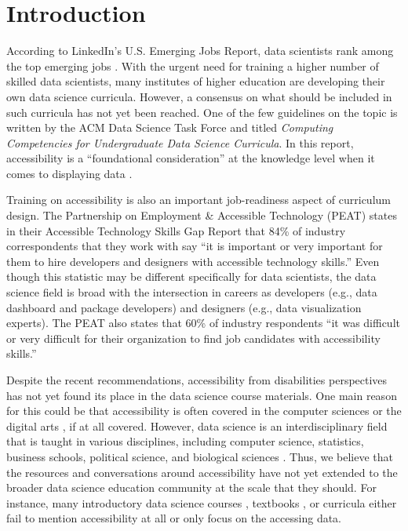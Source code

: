 \documentclass[12pt]{article}
\begin{document}
\newpage
{} %

\hypertarget{introduction}{%
\section{Introduction}\label{introduction}}

According to LinkedIn's U.S. Emerging Jobs Report, data scientists rank among the top emerging jobs \citeyearpar{linkedin}.
With the urgent need for training a higher number of skilled data scientists, many institutes of higher education are developing their own data science curricula.
However, a consensus on what should be included in such curricula has not yet been reached.
One of the few guidelines on the topic is written by the ACM Data Science Task Force and titled \emph{Computing Competencies for Undergraduate Data Science Curricula}. In this report, accessibility is a ``foundational consideration'' at the knowledge level when it comes to displaying data \citep{danyluk2021computing}.

Training on accessibility is also an important job-readiness aspect of curriculum design. The Partnership on Employment \& Accessible Technology (PEAT) states in their Accessible Technology Skills Gap Report \citeyearpar{peat} that 84\% of industry correspondents that they work with say ``it is important or very important for them to hire developers and designers with accessible technology skills.''
Even though this statistic may be different specifically for data scientists, the data science field is broad with the intersection in careers as developers (e.g., data dashboard and package developers) and designers (e.g., data visualization experts).
The PEAT also states that 60\% of industry respondents ``it was difficult or very difficult for their organization to find job candidates with accessibility skills.''

Despite the recent recommendations, accessibility from disabilities perspectives has not yet found its place in the data science course materials.
One main reason for this could be that accessibility is often covered in the computer sciences \citep{kawas2019teaching} or the digital arts \citep{barata2019inclusion}, if at all covered.
However, data science is an interdisciplinary field that is taught in various disciplines, including computer science, statistics, business schools, political science, and biological sciences \citep{schwab2021data}.
Thus, we believe that the resources and conversations around accessibility have not yet extended to the broader data science education community at the scale that they should.
For instance, many introductory data science courses \citep{yan2019first, baumer2015data}, textbooks \citep{adhikari2019computational, wickham2016r}, or curricula \citep{schwab2021data} either fail to mention accessibility at all or only focus on the accessing data.
\end{document}
